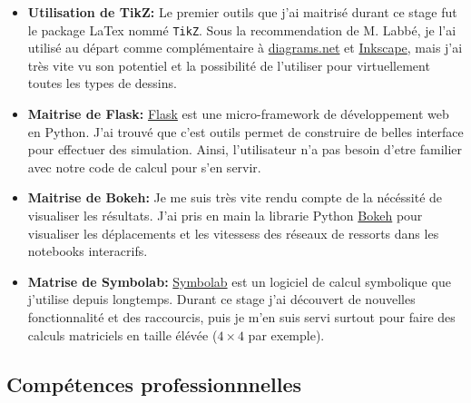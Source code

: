 \begin{itemize}
   \item \textbf{Utilisation de TikZ:} Le premier outils que j'ai maitrisé durant ce stage fut le package LaTex nommé \texttt{TikZ}. Sous la recommendation de M. Labbé, je l'ai utilisé au départ comme complémentaire à \href{https://www.diagrams.net/}{diagrams.net} et \href{https://inkscape.org/about/}{Inkscape}, mais j'ai très vite vu son potentiel et la possibilité de l'utiliser pour virtuellement toutes les types de dessins.
   \item \textbf{Maitrise de Flask:} \href{https://flask.palletsprojects.com/en/2.0.x/}{Flask} est une micro-framework de développement web en Python. J'ai trouvé que c'est outils permet de construire de belles interface pour effectuer des simulation. Ainsi, l'utilisateur n'a pas besoin d'etre familier avec notre code de calcul pour s'en servir. 
   \item \textbf{Maitrise de Bokeh:} Je me suis très vite rendu compte de la nécéssité de visualiser les résultats. J'ai pris en main la librarie Python \href{https://bokeh.org/}{Bokeh} pour visualiser les déplacements et les vitessess des réseaux de ressorts dans les notebooks interacrifs. 
   \item \textbf{Matrise de Symbolab:} \href{https://www.symbolab.com/}{Symbolab} est un logiciel de calcul symbolique que j'utilise depuis longtemps. Durant ce stage j'ai découvert de nouvelles fonctionnalité et des raccourcis, puis je m'en suis servi surtout pour faire des calculs matriciels en taille élévée ($4\times 4$ par exemple). 
\end{itemize}





\subsection{Compétences professionnnelles}

